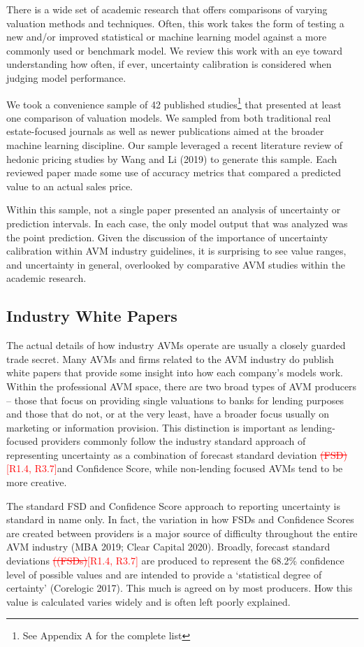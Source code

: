\documentclass[colTwo]{anon}
\theoremstyle{definition}
\begin{document}
There is a wide set of academic research that offers comparisons of varying valuation methods and techniques. Often, this work takes the form of testing a new and/or improved statistical or machine learning model against a more commonly used or benchmark model.  We review this work with an eye toward understanding how often, if ever, uncertainty calibration is considered when judging model performance. 

We took a convenience sample of 42 published studies\footnote{See Appendix A for the complete list} that presented at least one comparison of valuation models. We sampled from both traditional real estate-focused journals as well as newer publications aimed at the broader machine learning discipline. Our sample leveraged a recent literature review of hedonic pricing studies by Wang and Li (2019) to generate this sample.  Each reviewed paper made some use of accuracy metrics that compared a predicted value to an actual sales price.  

Within this sample, not a single paper presented an analysis of uncertainty or prediction intervals. In each case, the only model output that was analyzed was the point prediction.  Given the discussion of the importance of uncertainty calibration within AVM industry guidelines, it is surprising to see value ranges, and uncertainty in general, overlooked by comparative AVM studies within the academic research.  

\subsection{Industry White Papers}

The actual details of how industry AVMs operate are usually a closely guarded trade secret. Many AVMs and firms related to the AVM industry do publish white papers that provide some insight into how each company’s models work.   Within the professional AVM space, there are two broad types of AVM producers -- those that focus on providing single valuations to banks for lending purposes and those that do not, or at the very least, have a broader focus usually on marketing or information provision.  This distinction is important as lending-focused providers commonly follow the industry standard approach of representing uncertainty as a combination of forecast standard deviation \textcolor{red}{\st{(FSD)}[R1.4, R3.7]}and Confidence Score, while non-lending focused AVMs tend to be more creative.

The standard FSD and Confidence Score approach to reporting uncertainty is standard in name only. In fact, the variation in how FSDs and Confidence Scores are created between providers is a major source of difficulty throughout the entire AVM industry (MBA 2019; Clear Capital 2020).  Broadly, forecast standard deviations \textcolor{red}{\st{((FSDs)}[R1.4, R3.7]} are produced to represent the 68.2\% confidence level of possible values and are intended to provide a ‘statistical degree of certainty’ (Corelogic 2017).  This much is agreed on by most producers.  How this value is calculated varies widely and is often left poorly explained.  
\end{document}
